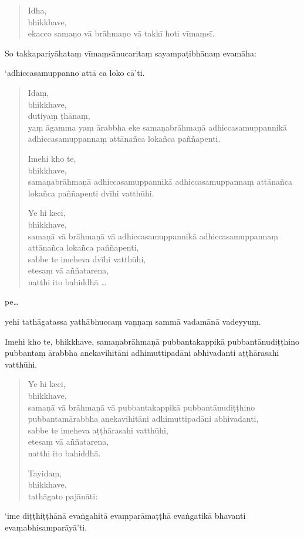 \documentclass[11pt,twoside,openright]{book}
\begin{document}
\begin{verse}
Idha,\\
\vin  bhikkhave,\\
\vin  ekacco samaṇo vā brāhmaṇo vā takkī hoti vīmaṃsī.

\end{verse}
\pstart
So takkapariyāhataṃ vīmaṃsānucaritaṃ sayampaṭibhānaṃ evamāha:
\pend

\pstart
‘adhiccasamuppanno attā ca loko cā’ti.
\pend

\begin{verse}
Idaṃ,\\
\vin  bhikkhave,\\
\vin  dutiyaṃ ṭhānaṃ,\\
\vin  yaṃ āgamma yaṃ ārabbha eke samaṇabrāhmaṇā adhiccasamuppannikā adhiccasamuppannaṃ attānañca lokañca paññapenti.

Imehi kho te,\\
\vin  bhikkhave,\\
\vin  samaṇabrāhmaṇā adhiccasamuppannikā adhiccasamuppannaṃ attānañca lokañca paññapenti dvīhi vatthūhi.

Ye hi keci,\\
\vin  bhikkhave,\\
\vin  samaṇā vā brāhmaṇā vā adhiccasamuppannikā adhiccasamuppannaṃ attānañca lokañca paññapenti,\\
\vin  sabbe te imeheva dvīhi vatthūhi,\\
\vin  etesaṃ vā aññatarena,\\
\vin  natthi ito bahiddhā …

\end{verse}
\pstart
pe…
\pend

\pstart
yehi tathāgatassa yathābhuccaṃ vaṇṇaṃ sammā vadamānā vadeyyuṃ.
\pend

\pstart
Imehi kho te, bhikkhave, samaṇabrāhmaṇā pubbantakappikā pubbantānudiṭṭhino pubbantaṃ ārabbha anekavihitāni adhimuttipadāni abhivadanti aṭṭhārasahi vatthūhi.
\pend

\begin{verse}
Ye hi keci,\\
\vin  bhikkhave,\\
\vin  samaṇā vā brāhmaṇā vā pubbantakappikā pubbantānudiṭṭhino pubbantamārabbha anekavihitāni adhimuttipadāni abhivadanti,\\
\vin  sabbe te imeheva aṭṭhārasahi vatthūhi,\\
\vin  etesaṃ vā aññatarena,\\
\vin  natthi ito bahiddhā.

Tayidaṃ,\\
\vin  bhikkhave,\\
\vin  tathāgato pajānāti:

\end{verse}
\pstart
‘ime diṭṭhiṭṭhānā evaṅgahitā evaṃparāmaṭṭhā evaṅgatikā bhavanti evaṃabhisamparāyā’ti.
\pend
\end{document}
